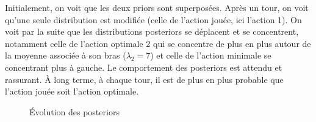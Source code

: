 \documentclass[letterpaper,11pt]{article}
\begin{document}
Initialement, on voit que les deux priors sont superposées. Après un tour, on voit qu'une seule distribution est modifiée (celle de l'action jouée, ici l'action 1). On voit par la suite que les distributions posteriors se déplacent et se concentrent, notamment celle de l'action optimale 2 qui se concentre de plus en plus autour de la moyenne associée à son bras ($\lambda_2=7$) et celle de l'action minimale se concentrant plus à gauche. Le comportement des posteriors est attendu et rassurant. À long terme, à chaque tour, il est de plus en plus probable que l'action jouée soit l'action optimale. 

\begin{figure}[H]
\caption{Évolution des posteriors}
\label{figure: évolution des posteriors}
\begin{center}


\end{center}
\end{figure}
\end{document}
